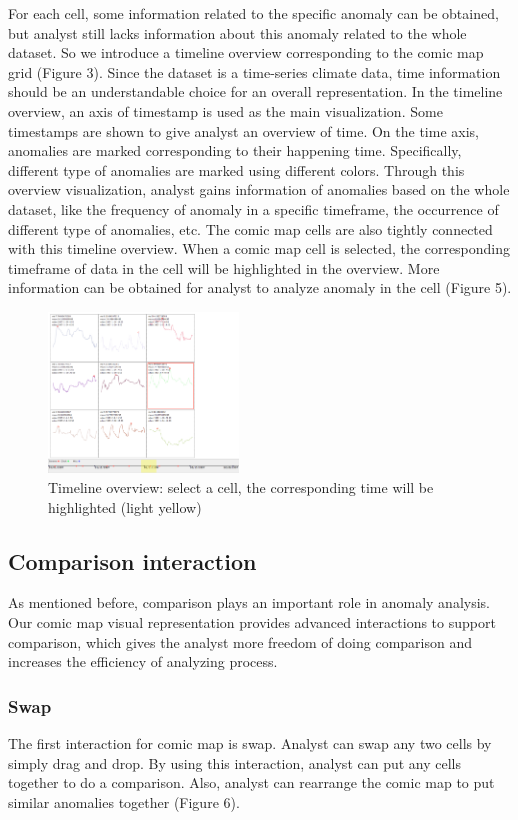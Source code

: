 \documentclass{vgtc}                          %
\begin{document}
For each cell, some information related to the specific anomaly can be obtained, but analyst still lacks information about this anomaly related to the whole dataset. So we introduce a timeline overview corresponding to the comic map grid (Figure 3). 
Since the dataset is a time-series climate data, time information should be an understandable choice for an overall representation. In the timeline overview, an axis of timestamp is used as the main visualization. Some timestamps are shown to give analyst an overview of time. On the time axis, anomalies are marked corresponding to their happening time. Specifically, different type of anomalies are marked using different colors. Through this overview visualization, analyst gains information of anomalies based on the whole dataset, like the frequency of anomaly in a specific timeframe, the occurrence of different type of anomalies, etc. 
The comic map cells are also tightly connected with this timeline overview. When a comic map cell is selected, the corresponding timeframe of data in the cell will be highlighted in the overview. More information can be obtained for analyst to analyze anomaly in the cell (Figure 5). 

\begin{figure}[htb]
	\centering
	\includegraphics[width=0.45\textwidth]{timeline2.png}
	\caption{Timeline overview: select a cell, the corresponding time will be highlighted (light yellow)}
\end{figure}

\subsection{Comparison interaction}
As mentioned before, comparison plays an important role in anomaly analysis. Our comic map visual representation provides advanced interactions to support comparison, which gives the analyst more freedom of doing comparison and increases the efficiency of analyzing process.

\subsubsection{Swap}
The first interaction for comic map is swap. Analyst can swap any two cells by simply drag and drop. By using this interaction, analyst can put any cells together to do a comparison.  Also, analyst can rearrange the comic map to put similar anomalies together (Figure 6).  
\end{document}
